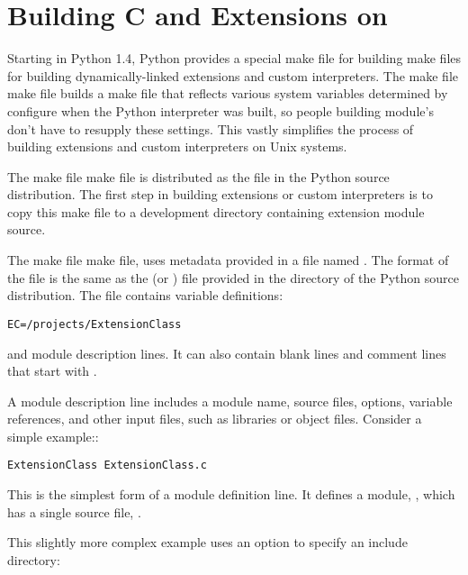 \documentclass{manual}
\begin{document}
\chapter{Building C and \Cpp{} Extensions on \UNIX{}
         \label{building-on-unix}}





Starting in Python 1.4, Python provides a special make file for
building make files for building dynamically-linked extensions and
custom interpreters.  The make file make file builds a make file
that reflects various system variables determined by configure when
the Python interpreter was built, so people building module's don't
have to resupply these settings.  This vastly simplifies the process
of building extensions and custom interpreters on Unix systems.

The make file make file is distributed as the file
 in the Python source distribution.  The
first step in building extensions or custom interpreters is to copy
this make file to a development directory containing extension module
source.

The make file make file,  uses metadata
provided in a file named .  The format of the 
file is the same as the  (or ) file
provided in the  directory of the Python source
distribution.  The  file contains variable definitions:

\begin{verbatim}
EC=/projects/ExtensionClass
\end{verbatim}

and module description lines.  It can also contain blank lines and
comment lines that start with \character{\#}.

A module description line includes a module name, source files,
options, variable references, and other input files, such
as libraries or object files.  Consider a simple example::

\begin{verbatim}
ExtensionClass ExtensionClass.c
\end{verbatim}

This is the simplest form of a module definition line.  It defines a
module, , which has a single source file,
.

This slightly more complex example uses an  option to
specify an include directory:
\end{document}
